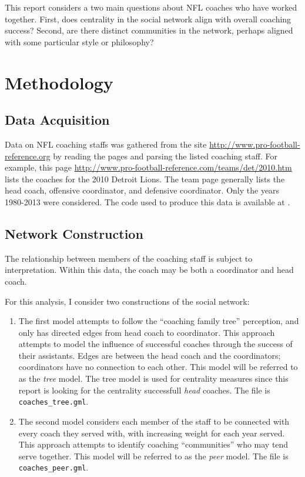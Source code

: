 \documentclass[11pt]{article}\usepackage[]{graphicx}\usepackage[]{color}
\begin{document}
This report considers a two main questions about NFL coaches who have worked
together.  First, does centrality in the social network align with overall
coaching success?  Second, are there distinct communities in the network,
perhaps aligned with some particular style or philosophy?

\section{Methodology}

\subsection{Data Acquisition}

Data on NFL coaching staffs was gathered from the site
\url{http://www.pro-football-reference.org} by reading the pages and parsing
the listed coaching staff.  For example, this page
\url{http://www.pro-football-reference.com/teams/det/2010.htm} lists the
coaches for the 2010 Detroit Lions.  The team page generally lists the head
coach, offensive coordinator, and defensive coordinator.  Only the years
1980-2013 were considered.  The code used to produce this data is available at \cite{scraper}.

\subsection{Network Construction}

The relationship between members of the coaching staff is subject to
interpretation.  Within this data, the coach may be both a coordinator and head
coach.  

For this analysis, I consider two constructions of the social network:
\begin{enumerate}

\item The first model attempts to follow the ``coaching family tree''
perception, and only has directed edges from head coach to coordinator.  This
approach attempts to model the influence of successful coaches through the
success of their assistants.  Edges are between the head coach and the
coordinators; coordinators have no connection to each other.  This model will
be referred to as the \emph{tree} model.  The tree model is used for centrality
measures since this report is looking for the centrality successfull
\emph{head} coaches.  The file is {\tt coaches\_tree.gml}.

\item The second model considers each member of the staff to be connected with
every coach they served with, with increasing weight for each year served.
This approach attempts to identify coaching ``communities'' who may tend serve
together.  This model will be referred to as the \emph{peer} model.  The file
is {\tt coaches\_peer.gml}.

\end{enumerate}
\end{document}
